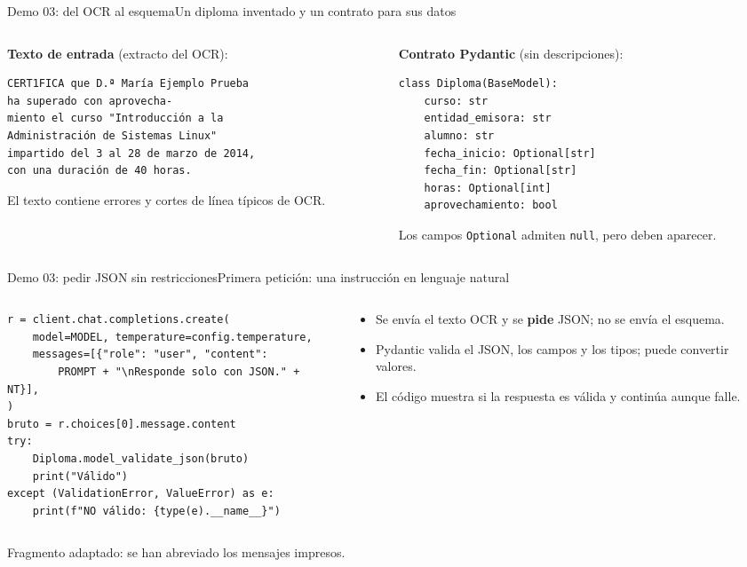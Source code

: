 \begin{frame}[fragile]{Demo 03: del OCR al esquema}{Un diploma inventado y un contrato para sus datos}
	\begin{columns}[T]
		\begin{column}{0.52\textwidth}
			{\scriptsize\textbf{Texto de entrada} (extracto del OCR):}
			\begin{lstlisting}[language={}]
CERT1FICA que D.ª María Ejemplo Prueba
ha superado con aprovecha-
miento el curso "Introducción a la
Administración de Sistemas Linux"
impartido del 3 al 28 de marzo de 2014,
con una duración de 40 horas.
\end{lstlisting}
			{\footnotesize El texto contiene errores y cortes de línea típicos de OCR.}
		\end{column}
		\begin{column}{0.46\textwidth}
			{\scriptsize\textbf{Contrato Pydantic} (sin descripciones):}
			\begin{lstlisting}
class Diploma(BaseModel):
    curso: str
    entidad_emisora: str
    alumno: str
    fecha_inicio: Optional[str]
    fecha_fin: Optional[str]
    horas: Optional[int]
    aprovechamiento: bool
\end{lstlisting}
			{\footnotesize Los campos \texttt{Optional} admiten \texttt{null}, pero deben aparecer.}
		\end{column}
	\end{columns}
\end{frame}

\begin{frame}[fragile]{Demo 03: pedir JSON sin restricciones}{Primera petición: una instrucción en lenguaje natural}
	\begin{columns}[T]
		\begin{column}{0.58\textwidth}
			\begin{lstlisting}
r = client.chat.completions.create(
    model=MODEL, temperature=config.temperature,
    messages=[{"role": "user", "content":
        PROMPT + "\nResponde solo con JSON." + NT}],
)
bruto = r.choices[0].message.content
try:
    Diploma.model_validate_json(bruto)
    print("Válido")
except (ValidationError, ValueError) as e:
    print(f"NO válido: {type(e).__name__}")
\end{lstlisting}
		\end{column}
		\begin{column}{0.4\textwidth}
			\footnotesize
			\begin{itemize}
				\item Se envía el texto OCR y se \textbf{pide} JSON; no se envía el esquema.
				\item Pydantic valida el JSON, los campos y los tipos; puede convertir valores.
				\item El código muestra si la respuesta es válida y continúa aunque falle.
			\end{itemize}
		\end{column}
	\end{columns}
	{\scriptsize Fragmento adaptado: se han abreviado los mensajes impresos.}
\end{frame}


